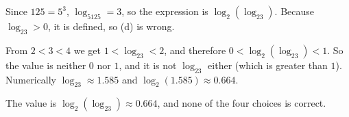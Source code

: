 Since $125=5^3$, $\log_5125=3$, so the expression is $\log_2\left(\log_23\right)$. Because $\log_23>0$, it is defined, so (d) is wrong.

From $2<3<4$ we get $1<\log_23<2$, and therefore $0<\log_2\left(\log_23\right)<1$. So the value is neither $0$ nor $1$, and it is not $\log_23$ either (which is greater than $1$). Numerically $\log_23\approx1.585$ and $\log_2(1.585)\approx0.664$.

The value is $\boxed{\log_2\left(\log_23\right)\approx0.664}$, and none of the four choices is correct.
